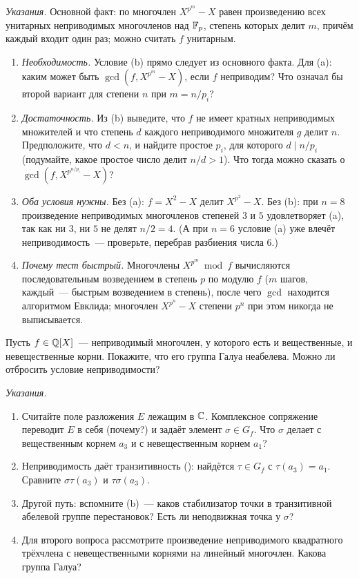 \noindent\emph{Указания.} Основной факт: по  многочлен $X^{p^m}-X$ равен произведению всех унитарных
неприводимых многочленов над $\mathbb F_p$, степень которых делит $m$, причём каждый входит один раз; можно считать $f$
унитарным.
\begin{enumerate}[leftmargin=*]
\item \emph{Необходимость.} Условие (b) прямо следует из основного факта. Для (a): каким может быть
$\gcd(f,X^{p^{m}}-X)$, если $f$ неприводим? Что означал бы второй вариант для степени $n$ при $m=n/p_i$?
\item \emph{Достаточность.} Из (b) выведите, что $f$ не имеет кратных неприводимых множителей и что степень $d$ каждого
неприводимого множителя $g$ делит $n$. Предположите, что $d<n$, и найдите простое $p_i$, для которого $d\mid n/p_i$
(подумайте, какое простое число делит $n/d>1$). Что тогда можно сказать о $\gcd(f,X^{p^{n/p_i}}-X)$?
\item \emph{Оба условия нужны.} Без (a): $f=X^2-X$ делит $X^{p^2}-X$. Без (b): при $n=8$ произведение неприводимых
многочленов степеней $3$ и $5$ удовлетворяет (a), так как ни $3$, ни $5$ не делят $n/2=4$. (А при $n=6$ условие (a)
уже влечёт неприводимость~--- проверьте, перебрав разбиения числа $6$.)
\item \emph{Почему тест быстрый.} Многочлены $X^{p^m}\bmod f$ вычисляются последовательным возведением в степень $p$ по
модулю $f$ ($m$ шагов, каждый~--- быстрым возведением в степень), после чего $\gcd$ находится алгоритмом Евклида;
многочлен $X^{p^n}-X$ степени $p^n$ при этом никогда не выписывается.
\end{enumerate}

\begin{exercise}[4-9]
Пусть $f\in\mathbb Q[X]$~--- неприводимый многочлен, у которого есть и вещественные, и невещественные корни. Покажите, что его
группа Галуа неабелева. Можно ли отбросить условие неприводимости?
\end{exercise}

\noindent\emph{Указания.}
\begin{enumerate}[leftmargin=*]
\item Считайте поле разложения $E$ лежащим в $\mathbb C$. Комплексное сопряжение переводит $E$ в себя (почему?) и задаёт элемент
$\sigma\in G_f$. Что $\sigma$ делает с вещественным корнем $a_3$ и с невещественным корнем $a_1$?
\item Неприводимость даёт транзитивность (): найдётся $\tau\in G_f$ с $\tau(a_3)=a_1$. Сравните $\sigma\tau(a_3)$ и
$\tau\sigma(a_3)$.
\item Другой путь: вспомните (b)~--- каков стабилизатор точки в транзитивной абелевой группе перестановок? Есть ли
неподвижная точка у $\sigma$?
\item Для второго вопроса рассмотрите произведение неприводимого квадратного трёхчлена с невещественными корнями на
линейный многочлен. Какова группа Галуа?
\end{enumerate}

